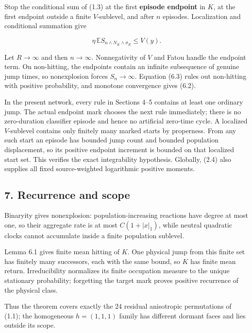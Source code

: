 Stop the conditional sum of (1.3) at the first \textbf{episode endpoint}
in \(K\), at the first endpoint outside a finite \(V\)-sublevel, and
after \(n\) episodes. Localization and conditional summation give

\[
                        \eta\,\mathbb ES_{n\wedge N_K\wedge\sigma_R}
                                  \le V(y).             \tag{6.3}
\]

Let \(R\to\infty\) and then \(n\to\infty\). Nonnegativity of \(V\) and
Fatou handle the endpoint term. On non-hitting, the endpoints contain an
infinite subsequence of genuine jump times, so nonexplosion forces
\(S_n\to\infty\). Equation (6.3) rules out non-hitting with positive
probability, and monotone convergence gives (6.2).

In the present network, every rule in Sections 4--5 contains at least
one ordinary jump. The actual endpoint mark chooses the next rule
immediately; there is no zero-duration classifier episode and hence no
artificial zero-time cycle. A localized \(V\)-sublevel contains only
finitely many marked starts by properness. From any such start an
episode has bounded jump count and bounded population displacement, so
its positive endpoint increment is bounded on that localized start set.
This verifies the exact integrability hypothesis. Globally, (2.4) also
supplies all fixed source-weighted logarithmic positive moments.

\subsection{7. Recurrence and scope}

Binaryity gives nonexplosion: population-increasing reactions have
degree at most one, so their aggregate rate is at most \(C(1+|x|_1)\),
while neutral quadratic clocks cannot accumulate inside a finite
population sublevel.

Lemma 6.1 gives finite mean hitting of \(K\). One physical jump from
this finite set has finitely many successors, each with the same bound,
so \(K\) has finite mean return. Irreducibility normalizes its finite
occupation measure to the unique stationary probability; forgetting the
target mark proves positive recurrence of the physical class.

Thus the theorem covers exactly the 24 residual anisotropic permutations
of (1.1); the homogeneous \(h=(1,1,1)\) family has different dormant
faces and lies outside its scope.
